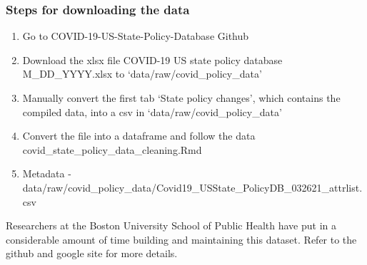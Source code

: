 \documentclass[
]{article}
\providecommand{\tightlist}{%
  \setlength{\itemsep}{0pt}\setlength{\parskip}{0pt}}
\begin{document}
\hypertarget{steps-for-downloading-the-data-3}{%
\subsubsection{Steps for downloading the
data}\label{steps-for-downloading-the-data-3}}

\begin{enumerate}
\def\labelenumi{\arabic{enumi}.}
\tightlist
\item
  Go to COVID-19-US-State-Policy-Database Github
\item
  Download the xlsx file COVID-19 US state policy database
  M\_DD\_YYYY.xlsx to `data/raw/covid\_policy\_data'
\item
  Manually convert the first tab `State policy changes', which contains
  the compiled data, into a csv in `data/raw/covid\_policy\_data'
\item
  Convert the file into a dataframe and follow the data
  covid\_state\_policy\_data\_cleaning.Rmd
\item
  Metadata -
  data/raw/covid\_policy\_data/Covid19\_USState\_PolicyDB\_032621\_attrlist.csv
\end{enumerate}

Researchers at the Boston University School of Public Health have put in
a considerable amount of time building and maintaining this dataset.
Refer to the github and google site for more details.
\end{document}
